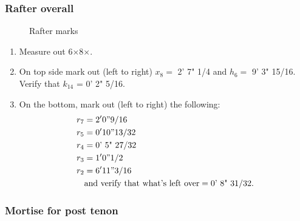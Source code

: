 \documentclass{article}\usepackage[]{graphicx}\usepackage[]{xcolor}
\begin{document}
\subsubsection{Rafter overall}
\begin{figure}[h]       
    \hspace{30px}
    \caption{Rafter marks}
\end{figure}

\begin{enumerate}
  \item Measure out 6$\times$8$\times$.
  \item On top side mark out (left to right) $x_8 = $ 2' 7" 1/4 and $h_6 = $ 9' 3" 15/16. Verify that $k_{14}$ = 0' 2" 5/16. 
  \item On the bottom, mark out (left to right) the following:
  \begin{align*}
    r_7 &= 2' 0" 9/16\\
    r_5 &= 0' 10" 13/32\\
    r_4 &= \text{0' 5" 27/32}\\
    r_3 &= 1' 0" 1/2\\
    r_2 &= 6' 11" 3/16\\
    & \text{and verify that what's left over} = \text{0' 8" 31/32}.
  \end{align*}
\end{enumerate}



\subsubsection{Mortise for post tenon}
\end{document}
